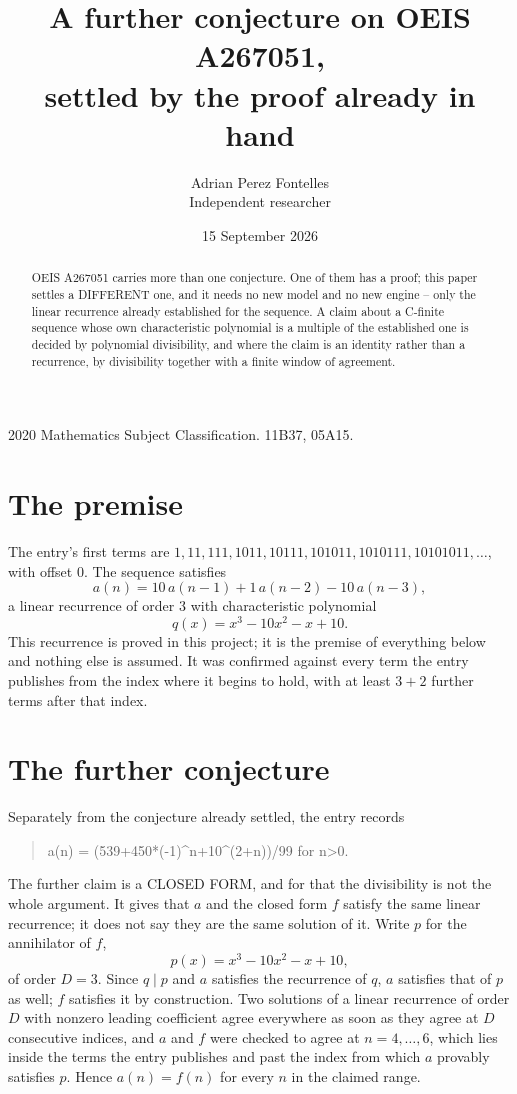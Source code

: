 \documentclass[11pt,a4paper]{article}
\title{A further conjecture on OEIS A267051,\\ \large settled by the proof already in hand}
\author{Adrian Perez Fontelles\\ \small Independent researcher}
\date{15 September 2026}
\theoremstyle{plain}
\theoremstyle{definition}
\begin{document}
\maketitle

\begin{abstract}
OEIS A267051 carries more than one conjecture. One of them has a proof; this paper settles a
DIFFERENT one, and it needs no new model and no new engine -- only the linear recurrence already
established for the sequence. A claim about a C-finite sequence whose own characteristic
polynomial is a multiple of the established one is decided by polynomial divisibility, and where
the claim is an identity rather than a recurrence, by divisibility together with a finite window
of agreement.
\end{abstract}

\noindent\small 2020 Mathematics Subject Classification. 11B37, 05A15.\normalsize

\section{The premise}

The entry's first terms are $1, 11, 111, 1011, 10111, 101011, 1010111, 10101011,\dots$, with offset $0$. The sequence satisfies
\[
  a(n)=10\,a(n-1) + 1\,a(n-2) - 10\,a(n-3) ,
\]
a linear recurrence of order $3$ with characteristic polynomial
\[
  q(x)=x^{3} - 10 x^{2} - x + 10 .
\]
This recurrence is proved in this project; it is the premise of everything below and nothing else is assumed.
It was confirmed against every term the entry publishes from the index where it begins to hold,
with at least $3+2$ further terms after that index.

\section{The further conjecture}

Separately from the conjecture already settled, the entry records

\begin{quote}\raggedright a(n) = (539+450*(-1)\^{}n+10\^{}(2+n))/99 for n>0.\end{quote}

The further claim is a CLOSED FORM, and for that the divisibility is not the whole argument. It
gives that $a$ and the closed form $f$ satisfy the same linear recurrence; it does not say they
are the same solution of it. Write $p$ for the annihilator of $f$,
\[
  p(x)=x^{3} - 10 x^{2} - x + 10 ,
\]
of order $D=3$. Since $q\mid p$ and $a$ satisfies the recurrence of $q$, $a$ satisfies that of
$p$ as well; $f$ satisfies it by construction. Two solutions of a linear recurrence of order $D$
with nonzero leading coefficient agree everywhere as soon as they agree at $D$ consecutive
indices, and $a$ and $f$ were checked to agree at $n=4,\dots,6$,
which lies inside the terms the entry publishes and past the index from which $a$ provably
satisfies $p$. Hence $a(n)=f(n)$ for every $n$ in the claimed range.
\end{document}
